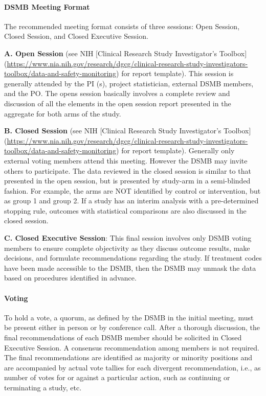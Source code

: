\documentclass[]{book}
\theoremstyle{definition}
\theoremstyle{definition}
\theoremstyle{definition}
\theoremstyle{remark}
\begin{document}
\paragraph{DSMB Meeting Format}\label{dsmb-meeting-format}

The recommended meeting format consists of three sessions: Open Session,
Closed Session, and Closed Executive Session.

\textbf{A. Open Session} (see NIH {[}Clinical Research Study
Investigator's Toolbox{]}
(\url{https://www.nia.nih.gov/research/dgcg/clinical-research-study-investigators-toolbox/data-and-safety-monitoring})
for report template). This session is generally attended by the PI (s),
project statistician, external DSMB members, and the PO. The opens
session basically involves a complete review and discussion of all the
elements in the open session report presented in the aggregate for both
arms of the study.

\textbf{B. Closed Session} (see NIH {[}Clinical Research Study
Investigator's Toolbox{]}
(\url{https://www.nia.nih.gov/research/dgcg/clinical-research-study-investigators-toolbox/data-and-safety-monitoring})
for report template). Generally only external voting members attend this
meeting. However the DSMB may invite others to participate. The data
reviewed in the closed session is similar to that presented in the open
session, but is presented by study-arm in a semi-blinded fashion. For
example, the arms are NOT identified by control or intervention, but as
group 1 and group 2. If a study has an interim analysis with a
pre-determined stopping rule, outcomes with statistical comparisons are
also discussed in the closed session.

\textbf{C. Closed Executive Session}: This final session involves only
DSMB voting members to ensure complete objectivity as they discuss
outcome results, make decisions, and formulate recommendations regarding
the study. If treatment codes have been made accessible to the DSMB,
then the DSMB may unmask the data based on procedures identified in
advance.

\paragraph{Voting}\label{voting}

To hold a vote, a quorum, as defined by the DSMB in the initial meeting,
must be present either in person or by conference call. After a thorough
discussion, the final recommendations of each DSMB member should be
solicited in Closed Executive Session. A consensus recommendation among
members is not required. The final recommendations are identified as
majority or minority positions and are accompanied by actual vote
tallies for each divergent recommendation, i.e., as number of votes for
or against a particular action, such as continuing or terminating a
study, etc.
\end{document}
